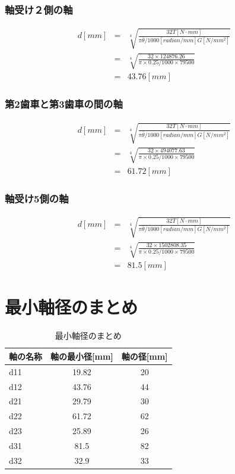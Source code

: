 \documentclass[a4j,twoside,openright,11pt]{jreport}
\begin{document}
\subsubsection{軸受け２側の軸}
\begin{eqnarray}
d[mm]&=&\sqrt[4]{\frac{32T[N \cdot mm]}{\pi \bar{\theta}/1000[radian/mm] G[N/mm^2]}}\\
     &=&\sqrt[4]{\frac{32\times 124876.26 }{\pi \times 0.25/1000 \times 79500}}\\
     &=&43.76[mm]
\end{eqnarray}
\subsubsection{第2歯車と第3歯車の間の軸}
\begin{eqnarray}
d[mm]&=&\sqrt[4]{\frac{32T[N \cdot mm]}{\pi \bar{\theta}/1000[radian/mm] G[N/mm^2]}}\\
     &=&\sqrt[4]{\frac{32\times 494077.63 }{\pi \times 0.25/1000 \times 79500}}\\
     &=&61.72[mm]
\end{eqnarray}
\subsubsection{軸受け5側の軸}
\begin{eqnarray}
d[mm]&=&\sqrt[4]{\frac{32T[N \cdot mm]}{\pi \bar{\theta}/1000[radian/mm] G[N/mm^2]}}\\
     &=&\sqrt[4]{\frac{32\times 1502808.35 }{\pi \times 0.25/1000 \times 79500}}\\
     &=&81.5[mm]
\end{eqnarray}
\section{最小軸径のまとめ}
\begin{table}[htb]
\begin{center}
  \caption{最小軸径のまとめ}
  \begin{tabular}{|l||c|c|} \hline
軸の名称&軸の最小径[mm]&軸の径[mm]\\\hline\hline
d11&19.82&20\\
d12&43.76&44\\
d21&29.79&30\\
d22&61.72&62\\
d23&25.89&26\\
d31&81.5&82\\
d32&32.9&33\\
\hline
  \end{tabular}
\end{center}
\end{table}
\end{document}

